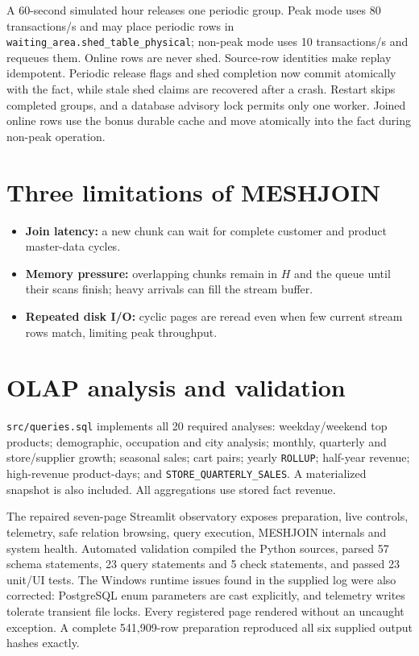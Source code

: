 \documentclass[10pt,a4paper]{article}
\begin{document}
A 60-second simulated hour releases one periodic group. Peak mode uses 80 transactions/s and may place periodic rows in \texttt{waiting\_area.shed\_table\_physical}; non-peak mode uses 10 transactions/s and requeues them. Online rows are never shed. Source-row identities make replay idempotent. Periodic release flags and shed completion now commit atomically with the fact, while stale shed claims are recovered after a crash. Restart skips completed groups, and a database advisory lock permits only one worker. Joined online rows use the bonus durable cache and move atomically into the fact during non-peak operation.

\section{Three limitations of MESHJOIN}
\begin{itemize}
\item \textbf{Join latency:} a new chunk can wait for complete customer and product master-data cycles.
\item \textbf{Memory pressure:} overlapping chunks remain in $H$ and the queue until their scans finish; heavy arrivals can fill the stream buffer.
\item \textbf{Repeated disk I/O:} cyclic pages are reread even when few current stream rows match, limiting peak throughput.
\end{itemize}

\section{OLAP analysis and validation}
\texttt{src/queries.sql} implements all 20 required analyses: weekday/weekend top products; demographic, occupation and city analysis; monthly, quarterly and store/supplier growth; seasonal sales; cart pairs; yearly \texttt{ROLLUP}; half-year revenue; high-revenue product-days; and \texttt{STORE\_QUARTERLY\_SALES}. A materialized snapshot is also included. All aggregations use stored fact revenue.

The repaired seven-page Streamlit observatory exposes preparation, live controls, telemetry, safe relation browsing, query execution, MESHJOIN internals and system health. Automated validation compiled the Python sources, parsed 57 schema statements, 23 query statements and 5 check statements, and passed 23 unit/UI tests. The Windows runtime issues found in the supplied log were also corrected: PostgreSQL enum parameters are cast explicitly, and telemetry writes tolerate transient file locks. Every registered page rendered without an uncaught exception. A complete 541,909-row preparation reproduced all six supplied output hashes exactly.
\end{document}
